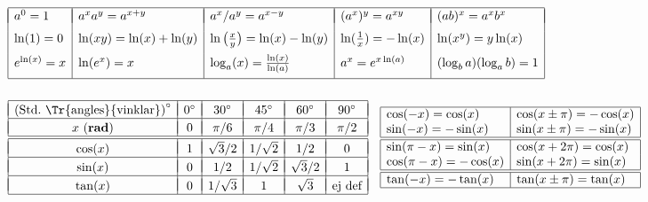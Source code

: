\documentclass{article}
\begin{document}
\subsection*{}%


$\begin{array}{|l|l|l|l|l|}\hline
  &&&&\\*[-11pt]
  a^0=1 &a^xa^y=a^{x+y} &
  a^x/a^y=a^{x-y}&(a^x)^y=a^{xy}
  & (ab)^x=a^xb^x
\EndRow
  \ln(1)=0 &\ln(xy)=\ln(x)+\ln(y) &\ln\big(\frac{x}{y}\big)
  =\ln(x)-\ln(y) &
  \ln(\frac1x) = -\ln(x) &
  \ln(x^y)=y\ln(x)
\EndRow
  e^{\ln(x)}=x & \ln(e^x)=x & \log_a(x)
  =\frac{\ln(x)}{\ln(a)} & a^x=e^{x\ln(a)} &
  (\log_ba)(\log_ab) = 1
\EndRow
\hline\end{array}$%

\subsubsection*{}%

{%
\let\F\frac
\newcommand\CC[1]{#1^\circ}
\def\vPad{&&&&&\\*[-10pt]}
\def\myEnd{\\\hline\vPad}
\newcommand\tW{{\sqrt2}}
\newcommand\tH{{\sqrt3}}
$
\begin{array}{|c|c|c|c|c|c|}
\hline\vPad
\mbox{(Std.~\Tr{angles}{vinklar})}^\circ
  & \CC{0} &\CC{30} &\CC{45} &\CC{60} &\CC{90}   %
 \myEnd
 x \mbox{ (\textbf{rad})}
        & 0     & \pi/6 & \pi/4 &  \pi/3 & \pi/2 %
 \\\hline\hline\vPad
 \cos(x)&   1   & \tH/2 & 1/\tW &  1/2  &   0    %
 \myEnd
 \sin(x)&   0   &   1/2 & 1/\tW & \tH/2 &   1    %
 \myEnd
 \tan(x)&   0   & 1/\tH &   1   & \tH   &
                                    \mbox{ej def}
 \\\hline
\end{array}
\quad
\begin{array}[m]{|l|l|}
\hline
  \cos(-x) = \cos(x)    & \cos(x\pm\pi) = -\cos(x) \\
  \sin(-x) = -\sin(x)   & \sin(x\pm\pi) = -\sin(x) \\
\hline
\hline
  \sin(\pi-x) = \sin(x) &  \cos(x+2\pi) = \cos(x) \\
  \cos(\pi-x) = -\cos(x)&  \sin(x+2\pi) = \sin(x) \\
\hline
\hline
 \tan(-x) = -\tan(x)     & \tan(x\pm\pi) = \tan(x) \\
\hline
\end{array}
$
}%
\end{document}
